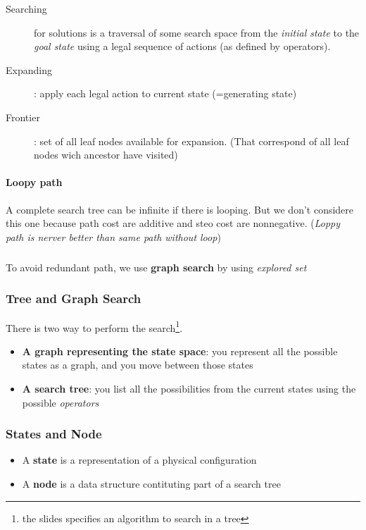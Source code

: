 \begin{description}

    \item[Searching] for solutions  is a traversal of  some search space
    from the \textit{initial  state} to the \textit{goal  state} using a
    legal sequence of actions (as defined by operators).

    \item[Expanding]  :  apply  each   legal  action  to  current  state
    (=generating state)

    \item[Frontier] : set of all leaf nodes available for expansion. 
        (That correspond of all leaf nodes wich ancestor have visited)
\end{description}

\paragraph{Loopy path} A  complete search tree can be  infinite if there
is  looping. But  we  don't considere  this one  because  path cost  are
additive and  steo cost are  nonnegative. (\textit{Loppy path  is nerver
better than same path without loop})

\subparagraph{ } To avoid redundant path, we use \textbf{graph search}
by using \textit{explored set}

\subsubsection{Tree and Graph Search}

There is two way to  perform the search\footnote{the slides specifies an
algorithm to search in a tree}.

\begin{itemize}

    \item \textbf{A  graph representing the state  space}: you represent
all the possible states as a graph, and you move between those states

    \item \textbf{A  search tree}: you  list all the  possibilities from
the current states using the possible \textit{operators}

\end{itemize}

\subsubsection{States and Node}
\begin{itemize}
    \item A \textbf{state} is a representation of a physical
        configuration
    \item A \textbf{node} is a data structure contituting part
        of a search tree
\end{itemize}

